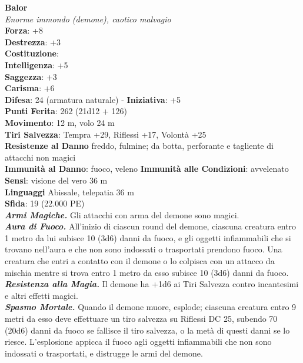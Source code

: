 \begin{multicols}{2}
\medskip\textbf{Balor}\\
\emph{Enorme immondo (demone), caotico malvagio}\\
\textbf{Forza}: +8\\
\textbf{Destrezza}: +3\\
\textbf{Costituzione}: \\\textbf{Intelligenza}: +5\\
\textbf{Saggezza}: +3\\
\textbf{Carisma}: +6\\
\textbf{Difesa}: 24 (armatura naturale) - \textbf{Iniziativa}: +5\\
\textbf{Punti Ferita}: 262 (21d12 + 126)\\
\textbf{Movimento}: 12 m, volo 24 m\\
\textbf{Tiri Salvezza}: Tempra +29, Riflessi +17, Volontà +25\\
\textbf{Resistenze al Danno} freddo, fulmine; da botta, perforante e tagliente di attacchi non magici\\ 
\textbf{Immunità al Danno}: fuoco, veleno \textbf{Immunità alle Condizioni}: avvelenato\\
\textbf{Sensi}: visione del vero 36 m\\
\textbf{Linguaggi} Abissale, telepatia 36 m\\
\textbf{Sfida}: 19 (22.000 PE)\smallskip\\
\emph{\textbf{Armi Magiche.}} Gli attacchi con arma del demone sono magici.\\
\emph{\textbf{Aura di Fuoco.}} All'inizio di ciascun round del demone, ciascuna creatura entro 1 metro da lui subisce 10 (3d6) danni da fuoco, e gli oggetti infiammabili che si trovano nell'aura e che non sono indossati o trasportati prendono fuoco. Una creatura che entri a contatto con il demone o lo colpisca con un attacco da mischia mentre si trova entro 1 metro da esso subisce 10 (3d6) danni da fuoco.\\
\emph{\textbf{Resistenza alla Magia.}} Il demone ha +1d6 ai Tiri Salvezza contro incantesimi e altri effetti magici.\\
\emph{\textbf{Spasmo Mortale.}} Quando il demone muore, esplode; ciascuna creatura entro 9 metri da esso deve effettuare un tiro salvezza su Riflessi DC  25, subendo 70 (20d6) danni da fuoco se fallisce il tiro salvezza, o la metà di questi danni se lo riesce. L'esplosione appicca il fuoco agli oggetti infiammabili che non sono indossati o trasportati, e distrugge le armi del demone. \\

\end{multicols}
